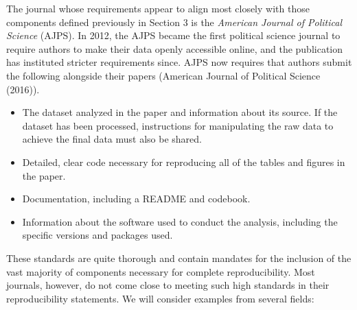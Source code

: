 \documentclass[12pt,twoside]{reedthesis}
\providecommand{\tightlist}{%
  \setlength{\itemsep}{0pt}\setlength{\parskip}{0pt}}
\begin{document}
The journal whose requirements appear to align most closely with those
components defined previously in Section 3 is the \emph{American Journal
of Political Science} (AJPS). In 2012, the AJPS became the first
political science journal to require authors to make their data openly
accessible online, and the publication has instituted stricter
requirements since. AJPS now requires that authors submit the following
alongside their papers (American Journal of Political Science (2016)).
\begin{itemize}
\tightlist
\item
  The dataset analyzed in the paper and information about its source. If
  the dataset has been processed, instructions for manipulating the raw
  data to achieve the final data must also be shared.
\item
  Detailed, clear code necessary for reproducing all of the tables and
  figures in the paper.
\item
  Documentation, including a README and codebook.
\item
  Information about the software used to conduct the analysis, including
  the specific versions and packages used.
\end{itemize}
These standards are quite thorough and contain mandates for the
inclusion of the vast majority of components necessary for complete
reproducibility. Most journals, however, do not come close to meeting
such high standards in their reproducibility statements. We will
consider examples from several fields:
\end{document}
